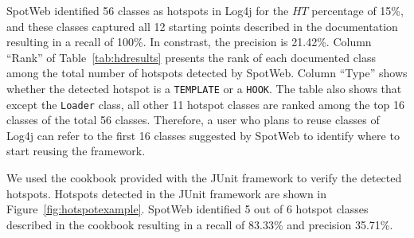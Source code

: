 \documentclass[conference]{IEEEtran}
\newcommand{\CodeIn}[1]{{\small\texttt{#1}}}
\begin{document}
SpotWeb identified 56 classes as hotspots in Log4j for
the $HT$ percentage of 15\%, and these classes captured 
all 12 starting points described in the
documentation resulting in a recall of 100\%. In constrast, the
precision is 21.42\%.  Column ``Rank'' of Table~\ref{tab:hdresults} presents the rank 
of each documented class among the total number of 
hotspots detected by SpotWeb. Column ``Type'' shows
whether the detected hotspot is a \CodeIn{TEMPLATE} or a
\CodeIn{HOOK}. The table also shows that except the
\CodeIn{Loader} class, all other 11 hotspot classes are ranked among
the top 16 classes of the total 56 classes. Therefore, a user who
plans to reuse classes of Log4j can refer to the first 16
classes suggested by SpotWeb to identify where to start reusing the
framework.

We used the cookbook provided with the JUnit framework to verify the
detected hotspots. Hotspots detected in the JUnit framework are
shown in Figure~\ref{fig:hotspotexample}. SpotWeb identified 
5 out of 6 hotspot classes described in the cookbook resulting in a recall of
83.33\% and precision 35.71\%. 
\end{document}
